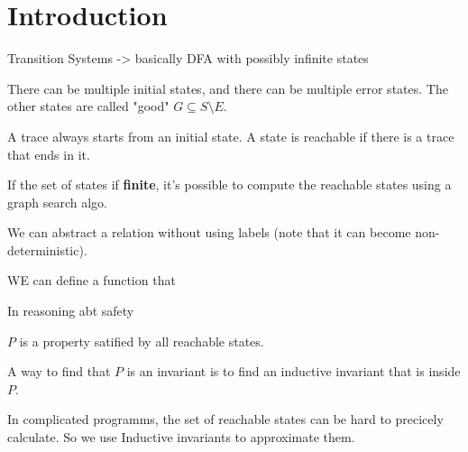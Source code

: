 % 
\chapter{Introduction}

Transition Systems -> basically DFA with possibly infinite states

There can be multiple initial states, and there can be multiple error states. The other states are called "good" $ G \subseteq S \setminus E $.

A trace always starts from an initial state. A state is reachable if there is a trace that ends in it.

If the set of states if \textbf{finite}, it's possible to compute the reachable states using a graph search algo.

We can abstract a relation without using labels (note that it can become non-deterministic).





WE can define a function that 



In reasoning abt safety

$ P $ is a property satified by all reachable states.


A way to find that $ P $ is an invariant is to find an inductive invariant that is inside $ P $.

In complicated programms, the set of reachable states can be hard to precicely calculate. So we use Inductive invariants to approximate them.





% 
